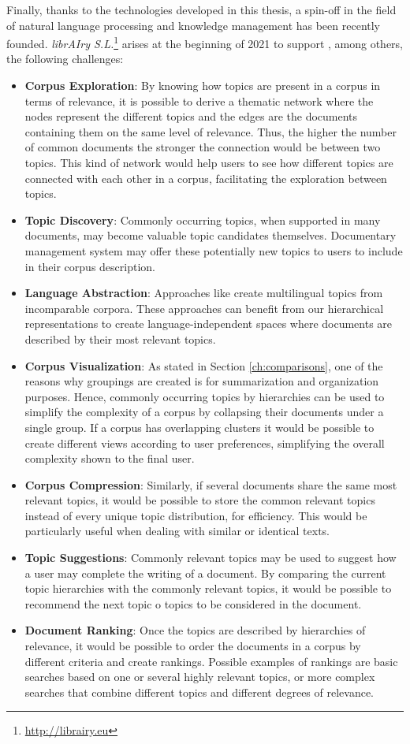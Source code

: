 Finally, thanks to the technologies developed in this thesis, a spin-off in the field of natural language processing and knowledge management has been recently founded. \textit{librAIry S.L.}\footnote{\url{http://librairy.eu}} arises at the beginning of 2021 to support , among others, the following challenges:
\begin{itemize}
\item \textbf{Corpus Exploration}: By knowing how topics are present in a corpus in terms of relevance, it is possible to derive a thematic network where the nodes represent the different topics and the edges are the documents containing them on the same level of relevance. Thus, the higher the number of common documents the stronger the connection would be between two topics. This kind of network would help users to see how different topics are connected with each other in a corpus, facilitating the exploration between topics.
\item \textbf{Topic Discovery}: Commonly occurring topics, when supported in many documents, may become valuable topic candidates themselves. Documentary management system may offer these potentially new topics to users to include in their corpus description.
\item \textbf{Language Abstraction}: Approaches like \citep{hao-paul-2018-learning} create multilingual topics from incomparable corpora. These approaches can benefit from our hierarchical representations to create language-independent spaces where documents are described by their most relevant topics.
\item \textbf{Corpus Visualization}: As stated in Section \ref{ch:comparisons}, one of the reasons why groupings are created is for summarization and organization purposes. Hence, commonly occurring topics by hierarchies can be used to simplify the complexity of a corpus by collapsing their documents under a single group. If a corpus has overlapping clusters it would be possible to create different views according to user preferences, simplifying the overall complexity shown to the final user.
\item \textbf{Corpus Compression}: Similarly, if several documents share the same most relevant topics, it would be possible to store the common relevant topics instead of every unique topic distribution, for efficiency. This would be particularly useful when dealing with similar or identical texts.
\item \textbf{Topic Suggestions}: Commonly relevant topics may be used to suggest how a user may complete the writing of a document. By comparing the current topic hierarchies with the commonly relevant topics, it would be possible to recommend the next topic o topics to be considered in the document.
\item \textbf{Document Ranking}: Once the topics are described by hierarchies of relevance, it would be possible to order the documents in a corpus by different criteria and create rankings. Possible examples of rankings are basic searches based on one or several highly relevant topics, or more complex searches that combine different topics and different degrees of relevance.  
\end{itemize}


